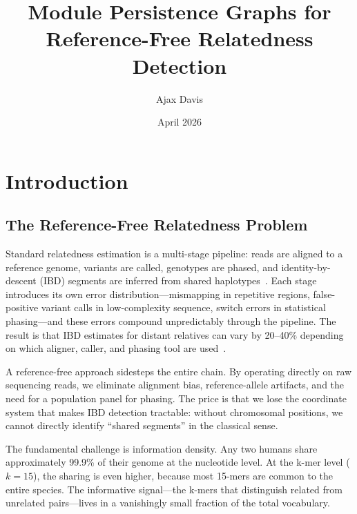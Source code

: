 \documentclass{../yalumba}
\title{Module Persistence Graphs for\\Reference-Free Relatedness Detection}
\author{Ajax Davis}
\date{April 2026}
\begin{document}
\maketitle

\tableofcontents
\newpage

\section{Introduction}
\label{sec:intro}


\subsection{The Reference-Free Relatedness Problem}

Standard relatedness estimation is a multi-stage pipeline: reads are aligned to
a reference genome, variants are called, genotypes are phased, and
identity-by-descent (IBD) segments are inferred from shared
haplotypes~\cite{browning2012ibd}.  Each stage introduces its own error
distribution---mismapping in repetitive regions, false-positive variant calls
in low-complexity sequence, switch errors in statistical phasing---and these
errors compound unpredictably through the pipeline.  The result is that IBD
estimates for distant relatives can vary by 20--40\% depending on which aligner,
caller, and phasing tool are used~\cite{browning2013refinedibd}.


A reference-free approach sidesteps the entire chain.  By operating directly on
raw sequencing reads, we eliminate alignment bias, reference-allele artifacts,
and the need for a population panel for phasing.  The price is that we lose the
coordinate system that makes IBD detection tractable: without chromosomal
positions, we cannot directly identify ``shared segments'' in the classical
sense.

The fundamental challenge is information density.  Any two humans share
approximately 99.9\% of their genome at the nucleotide level.  At the k-mer
level ($k = 15$), the sharing is even higher, because most 15-mers are common
to the entire species.  The informative signal---the k-mers that distinguish
related from unrelated pairs---lives in a vanishingly small fraction of the
total vocabulary.
\end{document}
